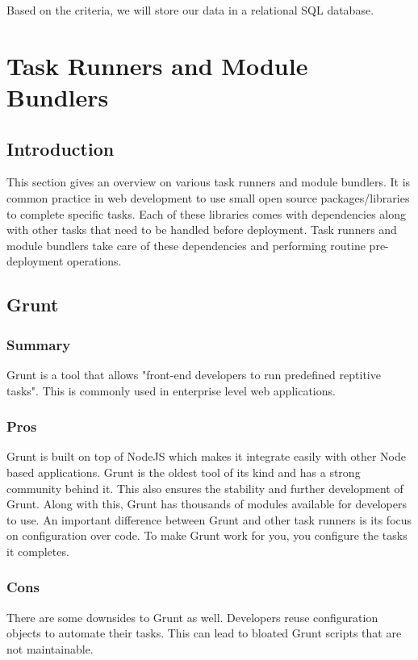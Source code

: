 \documentclass[draftclsnofoot,onecolumn,letterpaper,10pt,compsoc]{IEEEtran}
\begin{document}
        Based on the criteria, we will store our data in a relational SQL database.

\section{Task Runners and Module Bundlers}
    \subsection{Introduction}
        This section gives an overview on various task runners and module bundlers. 
        It is common practice in web development to use small open source packages/libraries to complete specific tasks. 
        Each of these libraries comes with dependencies along with other tasks that need to be handled before deployment. 
        Task runners and module bundlers take care of these dependencies and performing routine pre-deployment operations.
    
	\subsection{Grunt}
        \subsubsection{Summary}
            Grunt is a tool that allows "front-end developers to run predefined reptitive tasks"\cite{TaskRunners}. This is commonly used in enterprise level web applications.
        
        \subsubsection{Pros}
            Grunt is built on top of NodeJS which makes it integrate easily with other Node based applications.
            Grunt is the oldest tool of its kind and has a strong community behind it.
            This also ensures the stability and further development of Grunt.
            Along with this, Grunt has thousands of modules available for developers to use.
            An important difference between Grunt and other task runners is its focus on configuration over code.
            To make Grunt work for you, you configure the tasks it completes.
        
        \subsubsection{Cons} 
            There are some downsides to Grunt as well.
            Developers reuse configuration objects to automate their tasks.
            This can lead to bloated Grunt scripts that are not maintainable\cite{TaskRunners}.
    
\end{document}
